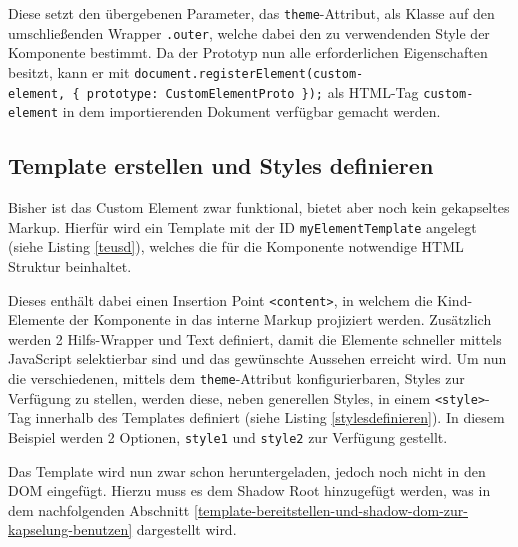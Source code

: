 

Diese setzt den übergebenen Parameter, das \texttt{theme}-Attribut, als Klasse auf den umschließenden Wrapper \texttt{.outer}, welche dabei den zu verwendenden Style der Komponente bestimmt. Da der Prototyp nun alle erforderlichen Eigenschaften besitzt, kann er mit \texttt{document.registerElement(\dq custom-element\dq,\ \{\ prototype:\ CustomElementProto\ \});} als \ac{HTML}-Tag \texttt{custom-element} in dem importierenden Dokument verfügbar gemacht werden.


\subsection{Template erstellen und Styles definieren}\label{template-erstellen-und-styles-definieren}

Bisher ist das Custom Element zwar funktional, bietet aber noch kein gekapseltes Markup. Hierfür wird ein Template mit der ID \texttt{myElementTemplate} angelegt (siehe Listing \ref{teusd}), welches die für die Komponente notwendige \ac{HTML} Struktur beinhaltet.



Dieses enthält dabei einen Insertion Point \texttt{\textless{}content\textgreater{}}, in welchem die Kind-Elemente der Komponente in das interne Markup projiziert werden. Zusätzlich werden 2 Hilfs-Wrapper und Text definiert, damit die Elemente schneller mittels JavaScript selektierbar sind und das gewünschte Aussehen erreicht wird. Um nun die verschiedenen, mittels dem \texttt{theme}-Attribut konfigurierbaren, Styles zur Verfügung zu stellen, werden diese, neben generellen Styles, in einem \texttt{\textless{}style\textgreater{}}-Tag innerhalb des Templates definiert (siehe Listing \ref{stylesdefinieren}). In diesem Beispiel werden 2 Optionen, \texttt{style1} und \texttt{style2} zur Verfügung gestellt.



Das Template wird nun zwar schon heruntergeladen, jedoch noch nicht in den \ac{DOM} eingefügt. Hierzu muss es dem Shadow Root hinzugefügt werden, was in dem nachfolgenden Abschnitt \ref{template-bereitstellen-und-shadow-dom-zur-kapselung-benutzen} dargestellt wird.


